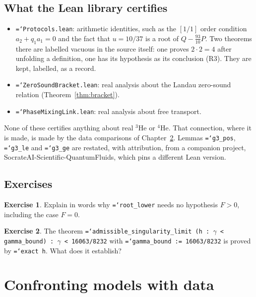\documentclass[11pt,a4paper,openany]{book}
\newcommand{\code}[1]{\texttt{\hyphenchar\font=`\-\relax #1}}
\theoremstyle{definition}
\newtheorem{exercise}{Exercise}[chapter]
\theoremstyle{plain}
\begin{document}
\section{What the Lean library certifies}

\begin{itemize}
  \item \code{Protocols.lean}: arithmetic identities, such as the $[1/1]$ order condition
        $a_2+q_1a_1=0$ and the fact that $u=10/37$ is a root of $Q-\frac{93}{10}P$. Two theorems
        there are labelled vacuous in the source itself: one proves $2\cdot2=4$ after unfolding a
        definition, one has its hypothesis as its conclusion (R3). They are kept, labelled, as a
        record.
  \item \code{ZeroSoundBracket.lean}: real analysis about the Landau zero-sound relation
        (Theorem~\ref{thm:bracket}).
  \item \code{PhaseMixingLink.lean}: real analysis about free transport.
\end{itemize}
None of these certifies anything about real $^3$He or $^4$He. That connection, where it is made,
is made by the data comparisons of Chapter~\ref{ch:data}. Lemmas \code{g3\_pos}, \code{g3\_le}
and \code{g3\_ge} are restated, with attribution, from a companion project,
SocrateAI-Scientific-QuantumFluids, which pins a different Lean version.

\section*{Exercises}
\begin{exercise}\label{ex:hF}
Explain in words why \code{root\_lower} needs no hypothesis $F>0$, including the case $F=0$.
\end{exercise}
\begin{exercise}\label{ex:vacuous}
The theorem \code{admissible\_singularity\_limit (h : $\gamma$ < gamma\_bound) : $\gamma$ < 16063/8232}
with \code{gamma\_bound := 16063/8232} is proved by \code{exact h}. What does it establish?
\end{exercise}

\chapter{Confronting models with data}
\label{ch:data}
\end{document}
